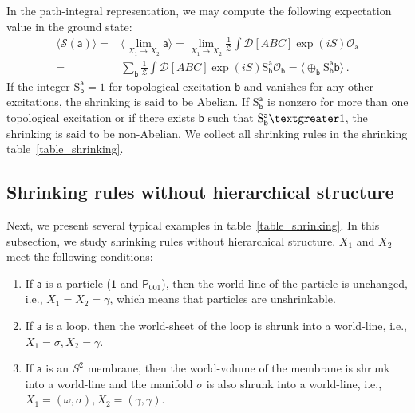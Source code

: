 \documentclass[11pt,nofootinbib,preprint]{revtex4-1}
\begin{document}
 
In the path-integral representation, we may compute the following expectation value in the ground state:
\begin{align}
	\langle \mathcal{S} \left( \mathsf{a} \right) \rangle =&\langle \underset{X_1\rightarrow X_2}{\lim}\mathsf{a} \rangle =\underset{X_1\rightarrow X_2}{\lim}\frac{1}{\mathcal{Z}}\int{\mathcal{D} \left[ ABC \right] \exp \left( iS \right) \mathcal{O} _{\mathsf{a}}} \nonumber
	\\
	=&\sum_{\mathsf{b}}\frac{1}{\mathcal{Z}}\int{\mathcal{D} \left[ ABC \right] \exp \left( iS \right) \mathrm{S}_{\mathsf{b}}^{\mathsf{a}}\mathcal{O} _{\mathsf{b}}} =\langle \oplus_{\mathsf{b}}{\mathrm{S}}_{\mathsf{b}}^{\mathsf{a}}\mathsf{b} \rangle \,.
	\label{eq_shrinking_pathintegral}
\end{align}
 If the integer ${\mathrm{S}}_{\mathsf{b}}^{\mathsf{a}}=1$ for topological excitation $\mathsf{b}$ and vanishes for any other excitations,  the shrinking is said to be Abelian. If ${\mathrm{S}}_{\mathsf{b}}^{\mathsf{a}}$ is nonzero for more than one topological excitation or if there exists $\mathsf{b}$ such that  ${\mathrm{S}}_{\mathsf{b}}^{\mathsf{a}}\textgreater 1$,  the shrinking is said to be non-Abelian. We collect all shrinking rules in the  shrinking table~\ref{table_shrinking}.
 
 
 
 
\subsection{Shrinking rules without hierarchical structure\label{section_shrinking_nohier}}
Next, we present several typical examples in table~\ref{table_shrinking}.  In this subsection, we study shrinking rules without hierarchical structure. $X_1$ and $X_2$ meet the following conditions:
\begin{enumerate}
	\item If $\mathsf{a}$ is a particle ($\mathsf{1}$ and $\mathsf{P}_{001}$), then the world-line of the particle is unchanged, i.e., $X_1=X_2=\gamma$, which means that particles are unshrinkable.
	\item If $\mathsf{a}$ is a loop, then the world-sheet of the loop is shrunk into a world-line, i.e., $X_1=\sigma, X_2=\gamma$.
	\item If $\mathsf{a}$ is an $S^2$ membrane, then the world-volume  of the membrane is shrunk into a world-line and the manifold $\sigma$ is also shrunk into a world-line, i.e., $X_1=(\omega,\sigma), X_2=(\gamma,\gamma)$.
\end{enumerate}
\end{document}
